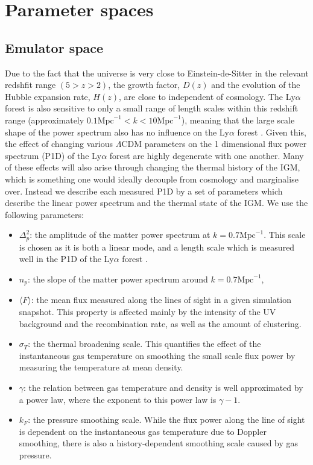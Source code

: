 \documentclass[]{article}
\newcommand{\lyaf}{Ly$\alpha$ forest }                     %
\begin{document}
\section{Parameter spaces}
\subsection{Emulator space}
Due to the fact that the universe is very close to Einstein-de-Sitter in the relevant 
redshfit range $(5>z>2)$, the growth factor, $D(z)$ and the evolution of the Hubble 
expansion rate, $H(z)$, are close to independent of cosmology. The \lyaf is also 
sensitive to only a small range of length scales within this redshift range 
(approximately $0.1 \mathrm{Mpc}^{-1} < k < 10 \mathrm{Mpc}^{-1}$), meaning that the large 
scale shape of the power spectrum also has no influence on the \lyaf. Given this, the 
effect of changing various $\Lambda$CDM parameters on the 1 dimensional flux power 
spectrum (P1D) of the \lyaf are highly degenerate with one another. Many of these effects 
will also arise through changing the thermal history of the IGM, which is something one 
would ideally decouple from cosmology and marginalise over. Instead we describe each 
measured P1D by a set of parameters which describe the linear power spectrum and the 
thermal state of the IGM. We use the following parameters:

\begin{itemize}
    \item $\Delta^2_p$: the amplitude of the matter power spectrum at $k=0.7 \mathrm{Mpc}^
    {-1}$. This scale is chosen as it is both a linear mode, and a length scale which is 
    measured well in the P1D of the \lyaf.
    \item $n_p$: the slope of the matter power spectrum around $k=0.7 \mathrm{Mpc}^{-1}$,
    \item $\langle F\rangle$: the mean flux measured along the lines of sight in
     a given simulation snapshot. 
    This property is affected mainly by the intensity of the UV background and the 
    recombination rate, as well as the amount of clustering.
    \item $\sigma_T$: the thermal broadening scale. This quantifies 
    the effect of the instantaneous gas temperature on smoothing the small scale flux power 
    by measuring the temperature at mean density.
    \item $\gamma$: the relation between gas temperature and density is well
    approximated by a power law, where the exponent to this power law is $\gamma-1$.
    \item $k_F$: the pressure smoothing scale. While the flux power along the line of 
    sight is dependent on the instantaneous gas temperature due to Doppler smoothing, there 
    is also a history-dependent smoothing scale caused by gas pressure\cite{Hui1997}\cite{Gnedin1998}.
\end{itemize}
\end{document}

